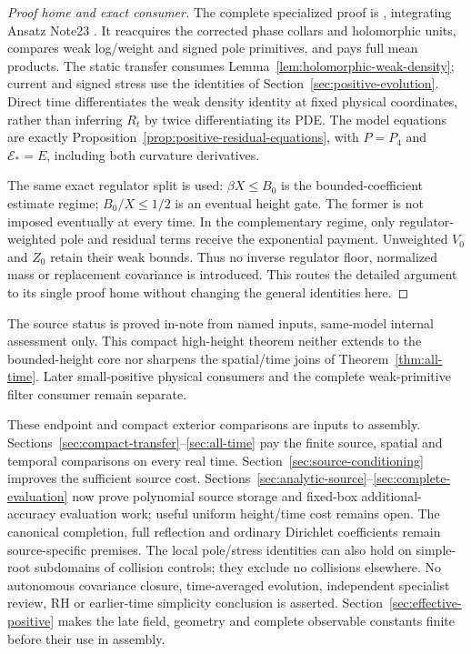 \begin{proof}[Proof home and exact consumer]
The complete specialized proof is
, integrating Ansatz Note23 \cite{an23}.
It reacquires the corrected phase collars and holomorphic units, compares
weak log/weight and signed pole primitives, and pays full mean products.
The static transfer consumes Lemma~\ref{lem:holomorphic-weak-density};
current and signed stress use the identities of
Section~\ref{sec:positive-evolution}. Direct time differentiates the weak
density identity at fixed physical coordinates, rather than inferring
$R_t$ by twice differentiating its PDE. The model equations are exactly
Proposition~\ref{prop:positive-residual-equations}, with $P=P_4$ and
$\mathcal E_*=E$, including both curvature derivatives.

The same exact regulator split is used: $\beta X\le B_0$ is the
bounded-coefficient estimate regime; $B_0/X\le1/2$ is an eventual height
gate. The former is not imposed eventually at every time. In the
complementary regime, only regulator-weighted pole and residual terms
receive the exponential payment. Unweighted $V_0$ and $Z_0$ retain their
weak bounds. Thus no inverse regulator floor, normalized mass or
replacement covariance is introduced. This routes the detailed argument
to its single proof home without changing the general identities here.
\end{proof}
The source status is proved in-note from named inputs, same-model
internal assessment only. This compact high-height theorem neither
extends to the bounded-height core nor sharpens the spatial/time joins
of Theorem~\ref{thm:all-time}. Later small-positive physical consumers
and the complete weak-primitive filter consumer remain separate.

These endpoint and compact exterior comparisons are inputs to assembly.
Sections~\ref{sec:compact-transfer}--\ref{sec:all-time} pay the
finite source, spatial and temporal comparisons on every real time.
Section~\ref{sec:source-conditioning} improves the sufficient source
cost. Sections~\ref{sec:analytic-source}--\ref{sec:complete-evaluation}
now prove polynomial source storage and fixed-box additional-accuracy
evaluation work; useful uniform height/time cost remains open.
The canonical completion, full reflection and ordinary Dirichlet
coefficients remain source-specific premises. The local pole/stress
identities can also hold on simple-root subdomains of collision controls;
they exclude no collisions elsewhere. No autonomous
covariance closure, time-averaged evolution, independent specialist review,
RH or earlier-time simplicity conclusion is asserted. Section~\ref{sec:effective-positive} makes the late field, geometry
and complete observable constants finite before their use in assembly.

